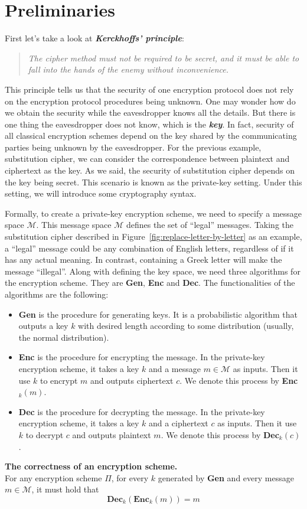 \section{Preliminaries}
\par First let's take a look at \textbf{\textit{Kerckhoffs’ principle}}:
\begin{quote}
  \textit{The cipher method must not be required to be secret, and it must be able to fall into the hands of the enemy without inconvenience.}
\end{quote}
This principle tells us that the security of one encryption protocol does not rely on the encryption protocol procedures being unknown. One may wonder how do we obtain the security while the eavesdropper knows all the details. But there is one thing the eavesdropper does not know, which is the \textbf{\textit{key}}. In fact, security of all classical encryption schemes depend on the key shared by the communicating parties being unknown by the eavesdropper. For the previous example, substitution cipher, we can consider the correspondence between plaintext and ciphertext as the key. As we said, the security of substitution cipher depends on the key being secret. This scenario is known as the private-key setting. Under this setting, we will introduce some cryptography syntax.
\par Formally, to create a private-key encryption scheme, we need to specify a message space $\mathcal{M}$. This message space $\mathcal{M}$ defines the set of ``legal'' messages. Taking the substitution cipher described in Figure~\ref{fig:replace-letter-by-letter} as an example, a ``legal'' message could be any combination of English letters, regardless of if it has any actual meaning. In contrast, containing a Greek letter will make the message  ``illegal''. Along with defining the key space, we need three algorithms for the encryption scheme. They are \textbf{Gen}, \textbf{Enc} and \textbf{Dec}. The functionalities of the algorithms are the following:
\begin{itemize}
  \item \textbf{Gen} is the procedure for generating keys. It is a probabilistic algorithm that outputs a key $k$ with desired length according to some distribution (usually, the normal distribution).
  \item \textbf{Enc} is the procedure for encrypting the message. In the private-key encryption scheme, it takes a key $k$ and a message $m \in \mathcal{M}$ as inputs. Then it use $k$ to encrypt $m$ and outputs ciphertext $c$. We denote this process by \textbf{Enc}$_k(m)$.
  \item \textbf{Dec} is the procedure for decrypting the message. In the private-key encryption scheme, it takes a key $k$ and a ciphertext $c$ as inputs. Then it use $k$ to decrypt $c$ and outputs plaintext $m$. We denote this process by \textbf{Dec}$_k(c)$.
\end{itemize}
\begin{definition} \textbf{The correctness of an encryption scheme.} \\
  For any encryption scheme $\Pi$, for every $k$ generated by \textbf{Gen} and every message $m \in \mathcal{M}$, it must hold that \[\textbf{Dec}_k(\textbf{Enc}_k(m)) = m\]
\end{definition}

